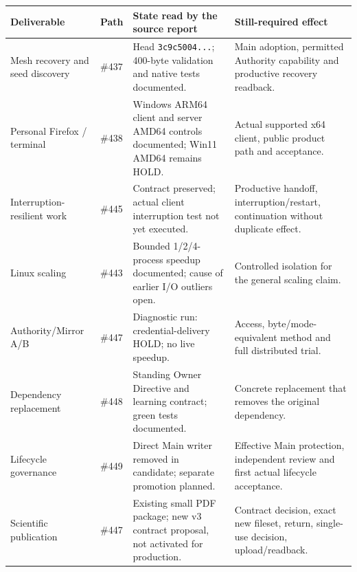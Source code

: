 \par
{\tighttable
\begin{tabularx}{\textwidth}{@{}p{31mm}p{18mm}Xp{49mm}@{}}\toprule
Deliverable & Path & State read by the source report & Still-required effect\\\midrule
Mesh recovery and seed discovery & \#437 & Head \texttt{3c9c5004...}; 400-byte validation and native tests documented. & Main adoption, permitted Authority capability and productive recovery readback.\\
Personal Firefox / terminal & \#438 & Windows ARM64 client and server AMD64 controls documented; Win11 AMD64 remains HOLD. & Actual supported x64 client, public product path and acceptance.\\
Interruption-resilient work & \#445 & Contract preserved; actual client interruption test not yet executed. & Productive handoff, interruption/restart, continuation without duplicate effect.\\
Linux scaling & \#443 & Bounded 1/2/4-process speedup documented; cause of earlier I/O outliers open. & Controlled isolation for the general scaling claim.\\
Authority/Mirror A/B & \#447 & Diagnostic run: credential-delivery HOLD; no live speedup. & Access, byte/mode-equivalent method and full distributed trial.\\
Dependency replacement & \#448 & Standing Owner Directive and learning contract; green tests documented. & Concrete replacement that removes the original dependency.\\
Lifecycle governance & \#449 & Direct Main writer removed in candidate; separate promotion planned. & Effective Main protection, independent review and first actual lifecycle acceptance.\\
Scientific publication & \#447 & Existing small PDF package; new v3 contract proposal, not activated for production. & Contract decision, exact new fileset, return, single-use decision, upload/readback.\\\bottomrule
\end{tabularx}}
